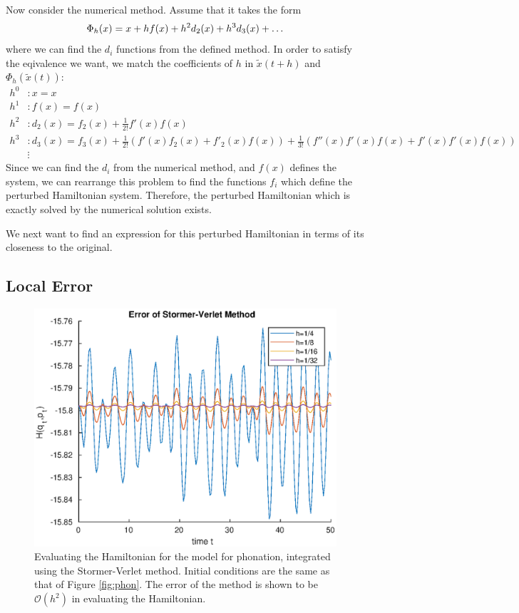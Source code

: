 \documentclass{report}
\theoremstyle{exampstyle} \newtheorem{example}[theorem]{Example}
\theoremstyle{exampstyle} \newtheorem{remark}[theorem]{Remark}
\theoremstyle{exampstyle} \newtheorem{definition}[theorem]{Definition}
\theoremstyle{exampstyle} \newtheorem{lemma}[theorem]{Lemma}
\begin{document}
Now consider the numerical method. Assume that it takes the form
\begin{equation*}
	\Phi_h(x) = x + h f(x) + h^2 d_2(x) + h^3 d_3(x) + \mathellipsis
\end{equation*}
where we can find the $d_i$ functions from the defined method. In order to satisfy the eqivalence we want, we match the coefficients of $h$ in $\tilde{x}(t+h)$ and $\Phi_h(\tilde{x}(t))$:
\begin{align*}
	h^0 &: x=x \\
	h^1 &: f(x) = f(x) \\
	h^2 &: d_2(x) = f_2(x) + \frac{1}{2!}f'(x)f(x) \\
	h^3 &: d_3(x) = f_3(x) + \frac{1}{2!}(f'(x)f_2(x) + f'_2(x)f(x)) + \frac{1}{3!}(f''(x)f'(x)f(x) + f'(x)f'(x)f(x)) \\
	& \vdots
\end{align*}
Since we can find the $d_i$ from the numerical method, and $f(x)$ defines the system,
we can rearrange this problem to find the functions $f_i$ which define the perturbed Hamiltonian system.
Therefore, the perturbed Hamiltonian which is exactly solved by the numerical solution exists. 

We next want to find an expression for this perturbed Hamiltonian in terms of its closeness to the original.

\subsection{Local Error}

\begin{figure}
	\centering
	\includegraphics[width = 0.75\linewidth]{figures/phonationerr.eps}
	\caption{
		Evaluating the Hamiltonian for the model for phonation, integrated using the Stormer-Verlet method.
		Initial conditions are the same as that of Figure \ref{fig:phon}.
		The error of the method is shown to be $\mathcal{O}(h^2)$ in evaluating the Hamiltonian.
	}
	\label{fig:phonhamil}
\end{figure}
\end{document}
